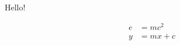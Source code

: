\documentclass{article}
\begin{document}
Hello!

\begin{align}
e&=mc^2\\
y&=mx+c
\end{align}
\end{document}
